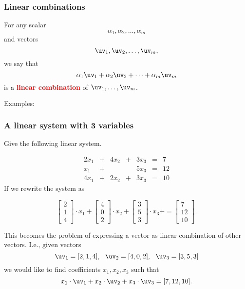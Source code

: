 \begin{frame}
  \frametitle{Linear combinations}
  For any scalar \
  \[
  \alpha_1,\alpha_2,\ldots,\alpha_m
  \]
  and vectors
  \[
  \uv_1,\uv_2,\ldots,\uv_m,
  \]
  we say that
  \[
  \alpha_1\uv_1 + \alpha_2\uv_2 + \cdots + \alpha_m \uv_m
  \]
  is a \textcolor{red}{\bf linear combination} of $\uv_1,\ldots,\uv_m$.
  \pause
  \vspace{0.2in}

  Examples:
  \vspace{1in}
\end{frame}


\begin{frame}
  \frametitle{A linear system with 3 variables}
  Give the following linear system.

  {\footnotesize
  \[
  \begin{array}{rcrcrcl}
    2x_1 & + & 4x_2 & + & 3x_3 & = & 7 \\
    x_1 & + &  &  & 5x_3 & = & 12 \\
    4x_1 & + & 2x_2 & + & 3x_3 & = & 10
  \end{array}
  \]
  }
  \pause
  If we rewrite the system as

  {\footnotesize
  \[
  \begin{bmatrix}
    2 \\ 1 \\ 4
  \end{bmatrix}
  \cdot x_1 +
  \begin{bmatrix}
    4 \\ 0 \\ 2
  \end{bmatrix}
  \cdot x_2 +
  \begin{bmatrix}
    3 \\ 5 \\ 3
  \end{bmatrix}
  \cdot x_3 +
  =
  \begin{bmatrix}
    7 \\ 12 \\ 10
  \end{bmatrix}.
  \]
  }

  \pause
  This becomes the problem of expressing a vector as linear
  combination of other vectors.  I.e., given vectors
  \[
  \uv_1 = [2,1,4], \ \ \uv_2 = [4,0,2], \ \ \uv_3 = [3,5,3]
  \]
  we would like to find coefficients $x_1,x_2,x_3$ such that
  \[
  x_1\cdot \uv_1 + x_2\cdot \uv_2 + x_3\cdot \uv_3 = [7,12,10].
  \]
\end{frame}


